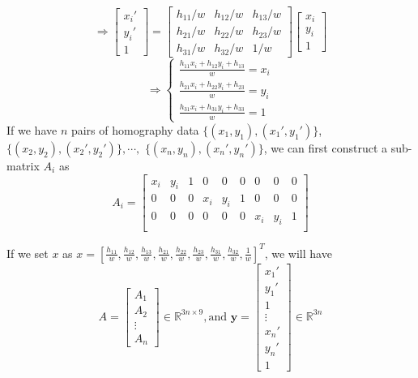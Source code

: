 \documentclass[12pt]{article}
\begin{document}
\begin{enumerate}
\begin{enumerate}
			$$\Rightarrow\begin{bmatrix}
			x_i'\\y_i'\\1
			\end{bmatrix}=\begin{bmatrix}
			h_{11}/w & h_{12}/w & h_{13}/w\\
			h_{21}/w & h_{22}/w & h_{23}/w\\
			h_{31}/w & h_{32}/w & 1/w
			\end{bmatrix}\begin{bmatrix}
			x_i\\y_i\\1
			\end{bmatrix}$$
			$$\Rightarrow\begin{cases}
			\frac{h_{11}x_i+h_{12}y_i+h_{13}}{w}=x_i\\
			\frac{h_{21}x_i+h_{22}y_i+h_{23}}{w}=y_i\\
			\frac{h_{31}x_i+h_{31}y_i+h_{33}}{w}=1
			\end{cases}$$
			If we have $n$ pairs of homography data $\{(x_1,y_1),(x_1',y_1')\}$, $\{(x_2,y_2),(x_2',y_2')\},\cdots,$ $\{(x_n,y_n),(x_n',y_n')\}$, we can first construct a sub-matrix $A_{i}$ as 
			$$A_{i}=\begin{bmatrix}
			x_i & y_i & 1 & 0 & 0 & 0 & 0 & 0 & 0\\
			0 & 0 & 0 & x_i & y_i & 1 &  0 & 0 & 0\\
			 0 & 0 & 0 & 0 & 0 & 0 & x_i & y_i & 1 \\
			\end{bmatrix}$$
			
			If we set $x$ as $x=[\frac{h_{11}}{w},\frac{h_{12}}{w},\frac{h_{13}}{w},\frac{h_{21}}{w},\frac{h_{22}}{w},\frac{h_{23}}{w},\frac{h_{31}}{w},\frac{h_{32}}{w},\frac{1}{w}]^T$, we will have
			$$A=\begin{bmatrix}
			A_1\\A_2\\\vdots\\A_n
			\end{bmatrix}\in\mathbb{R}^{3n\times9}, \text{and }\mathbf{y}=\begin{bmatrix}
			x_1'\\y_1'\\1\\\vdots\\x_n'\\y_n'\\1
			\end{bmatrix}\in\mathbb{R}^{3n}$$\\
			

\end{enumerate}
\end{enumerate}
\end{document}

